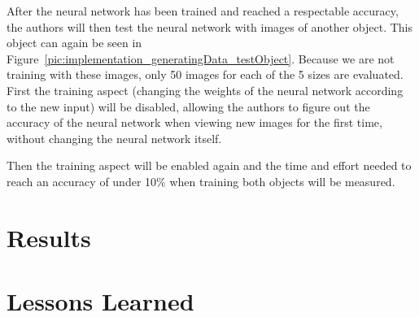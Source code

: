After the neural network has been trained and reached a respectable accuracy, the authors will then test the neural network with images of another object. This object can again be seen in Figure~\ref{pic:implementation_generatingData_testObject}. Because we are not training with these images, only 50 images for each of the 5 sizes are evaluated. First the training aspect (changing the weights of the neural network according to the new input) will be disabled, allowing the authors to figure out the accuracy of the neural network when viewing new images for the first time, without changing the neural network itself.

Then the training aspect will be enabled again and the time and effort needed to reach an accuracy of under 10\% when training both objects will be measured.

\section{Results}

\section{Lessons Learned}

\filbreak